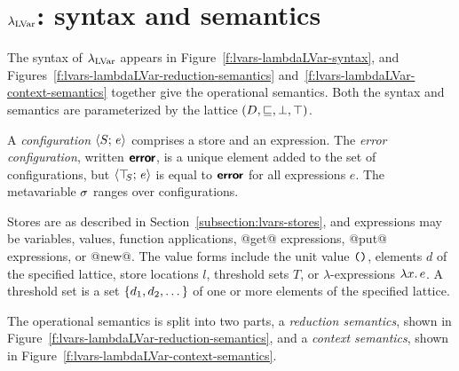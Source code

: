 \section{$\lambda_{\textrm{LVar}}$: syntax and semantics}\label{s:lvars-lambdalvar}

\FigLambdaLVarGrammar

\FigLambdaLVarReductionSemantics

\FigLambdaLVarContextSemantics

The syntax of $\lambda_{\textrm{LVar}}$ appears in
Figure~\ref{f:lvars-lambdaLVar-syntax}, and
Figures~\ref{f:lvars-lambdaLVar-reduction-semantics}
and~\ref{f:lvars-lambdaLVar-context-semantics} together give the
operational semantics.  Both the syntax and semantics are
parameterized by the lattice $(D, \sqsubseteq, \bot, \top)$.

A \emph{configuration} $\langle S;\, e \rangle$ comprises a store and an
expression.  The \emph{error configuration}, written $\textbf{\textsf{error}}$, is a
unique element added to the set of configurations, but
$\langle \top\hspace{-0.85mm}_{S};\, e \rangle$ is equal to $\textbf{\textsf{error}}$ for all expressions $e$.  The
metavariable $\sigma$ ranges over configurations.

Stores are as described in Section~\ref{subsection:lvars-stores}, and
expressions may be variables, values, function applications, @get@
expressions, @put@ expressions, or @new@.  The value forms include the
unit value $\mbox{\texttt{()}}$, elements $d$ of the specified lattice, store
locations $l$, threshold sets $T$, or $\lambda$-expressions
$\lambda x.\,e$.  A threshold set is a set $\left\{d_1, d_2, \dots\right\}$ of
one or more elements of the specified lattice.

The operational semantics is split into two parts, a \emph{reduction
  semantics}, shown in
Figure~\ref{f:lvars-lambdaLVar-reduction-semantics}, and a
\emph{context semantics}, shown in
Figure~\ref{f:lvars-lambdaLVar-context-semantics}.

